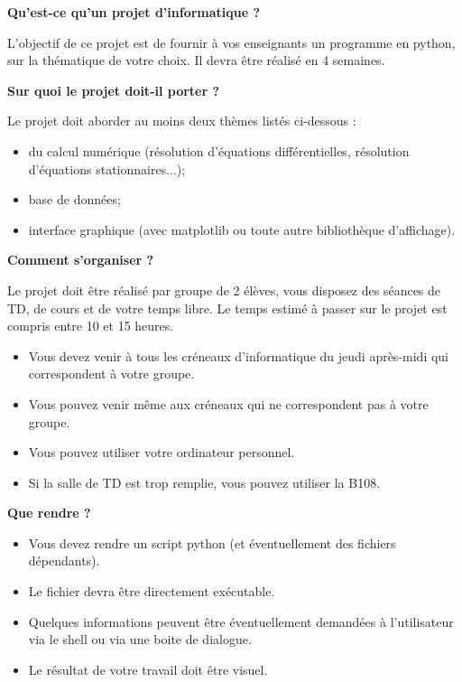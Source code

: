 \documentclass[10pt,fleqn]{article} %
\begin{document}

\vspace{2cm}
\pagestyle{fancy}
\thispagestyle{plain}


\textbf{Qu'est-ce qu'un projet d'informatique ?}

L'objectif de ce projet est de fournir à vos enseignants un programme en python, sur la thématique de votre choix. Il devra être réalisé en 4 semaines.

\vspace{.5cm}
\textbf{Sur quoi le projet doit-il porter ?}

Le projet doit aborder au moins deux thèmes listés ci-dessous : 
\begin{itemize}
\item du calcul numérique (résolution d'équations différentielles, résolution d'équations stationnaires...);
\item base de données;
\item interface graphique (avec matplotlib ou toute autre bibliothèque d'affichage).
\end{itemize}

\vspace{.5cm}
\textbf{Comment s'organiser ?}

Le projet doit être réalisé par groupe de 2 élèves, vous disposez des séances de TD, de cours et de votre temps libre. Le temps estimé à passer sur le projet est compris entre 10 et 15 heures.

\begin{itemize}
\item Vous devez venir à tous les créneaux d'informatique du jeudi après-midi qui correspondent à votre groupe. 
\item Vous pouvez venir même aux créneaux qui ne correspondent pas à votre groupe.
\item Vous pouvez utiliser votre ordinateur personnel. 
\item Si la salle de TD est trop remplie, vous pouvez utiliser la B108.
\end{itemize}

\vspace{.5cm}
\textbf{Que rendre ?}
\begin{itemize}
\item Vous devez rendre un script python (et éventuellement des fichiers dépendants).
\item Le fichier devra être directement exécutable. 
\item Quelques informations peuvent être éventuellement demandées à l'utilisateur via le shell ou via une boite de dialogue.
\item Le résultat de votre travail doit être visuel.
\end{itemize}
\end{document}
